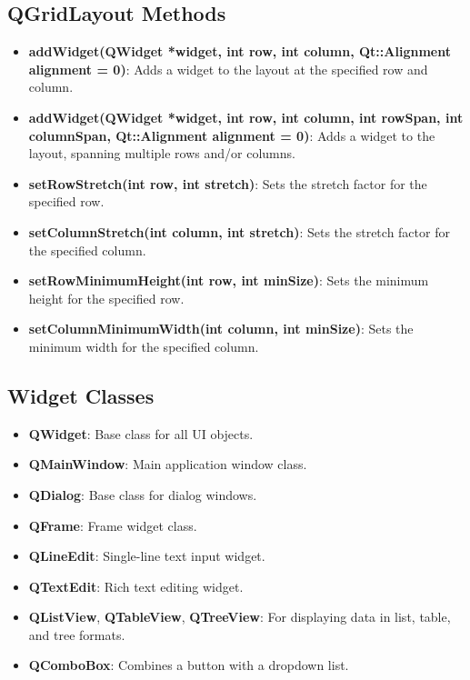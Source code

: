 \documentclass{report}
\begin{document}
    \subsection{QGridLayout Methods}
    \begin{itemize}
        \item \textbf{addWidget(QWidget *widget, int row, int column, Qt::Alignment alignment = 0)}: Adds a widget to the layout at the specified row and column.
        \item \textbf{addWidget(QWidget *widget, int row, int column, int rowSpan, int columnSpan, Qt::Alignment alignment = 0)}: Adds a widget to the layout, spanning multiple rows and/or columns.
        \item \textbf{setRowStretch(int row, int stretch)}: Sets the stretch factor for the specified row.
        \item \textbf{setColumnStretch(int column, int stretch)}: Sets the stretch factor for the specified column.
        \item \textbf{setRowMinimumHeight(int row, int minSize)}: Sets the minimum height for the specified row.
        \item \textbf{setColumnMinimumWidth(int column, int minSize)}: Sets the minimum width for the specified column.
    \end{itemize}

    \pagebreak 

    \bigbreak \noindent 
    \subsection{Widget Classes}
    \begin{itemize}
        \item \textbf{QWidget}: Base class for all UI objects.
        \item \textbf{QMainWindow}: Main application window class.
        \item \textbf{QDialog}: Base class for dialog windows.
        \item \textbf{QFrame}: Frame widget class.
        \item \textbf{QLineEdit}: Single-line text input widget.
        \item \textbf{QTextEdit}: Rich text editing widget.
        \item \textbf{QListView}, \textbf{QTableView}, \textbf{QTreeView}: For displaying data in list, table, and tree formats.
        \item \textbf{QComboBox}: Combines a button with a dropdown list.
    \end{itemize}
\end{document}
